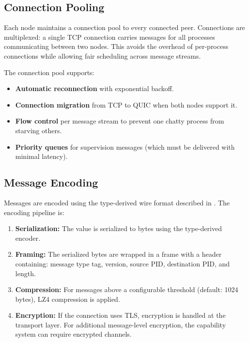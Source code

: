\documentclass[11pt,a4paper]{article}
\begin{document}
\subsection{Connection Pooling}

Each node maintains a connection pool to every connected peer. Connections
are multiplexed: a single TCP connection carries messages for all processes
communicating between two nodes. This avoids the overhead of per-process
connections while allowing fair scheduling across message streams.

The connection pool supports:
\begin{itemize}[nosep]
  \item \textbf{Automatic reconnection} with exponential backoff.
  \item \textbf{Connection migration} from TCP to QUIC when both nodes support it.
  \item \textbf{Flow control} per message stream to prevent one chatty
        process from starving others.
  \item \textbf{Priority queues} for supervision messages (which must be
        delivered with minimal latency).
\end{itemize}

\subsection{Message Encoding}

Messages are encoded using the type-derived wire format described in
. The encoding pipeline is:

\begin{enumerate}[nosep]
  \item \textbf{Serialization:} The value is serialized to bytes using the
        type-derived encoder.
  \item \textbf{Framing:} The serialized bytes are wrapped in a frame with
        a header containing: message type tag, version, source PID,
        destination PID, and length.
  \item \textbf{Compression:} For messages above a configurable threshold
        (default: 1024 bytes), LZ4 compression is applied.
  \item \textbf{Encryption:} If the connection uses TLS, encryption is
        handled at the transport layer. For additional message-level
        encryption, the capability system can require encrypted channels.
\end{enumerate}
\end{document}
